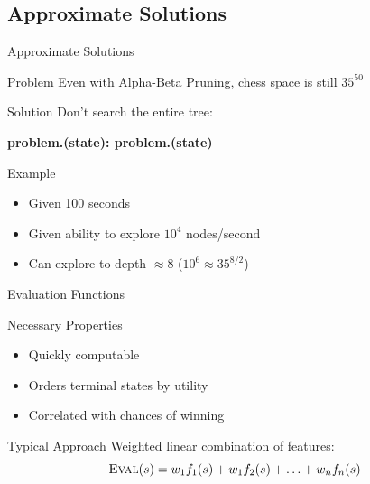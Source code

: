 \documentclass[14pt]{beamer}
\begin{document}
\subsection{Approximate Solutions}
\begin{frame}[fragile]{Approximate Solutions}
	\begin{block}{Problem}
		Even with Alpha-Beta Pruning, chess space is still $35^{50}$
	\end{block}
	\pause
	\begin{block}{Solution}
		Don't search the entire tree:
		\begin{semiverbatim}\scriptsize\bfseries
		     problem.(state):
		         problem.(state)
		
		\end{semiverbatim}
	\end{block}
	\pause\pause
	\begin{block}{Example}
		\begin{itemize}
			\item Given 100 seconds
			\item Given ability to explore $10^4$ nodes/second
			\item Can explore to depth $\approx 8$ ($10^6 \approx 35^{8/2}$)
		\end{itemize}
	\end{block}
\end{frame}
\begin{frame}{Evaluation Functions}
	\begin{block}{Necessary Properties}
		\begin{itemize}
			\item Quickly computable
			\item Orders terminal states by utility
			\item Correlated with chances of winning
		\end{itemize}
	\end{block}
	\pause
	\begin{block}{Typical Approach}
		Weighted linear combination of features:
		\[\mbox{\sc Eval}(s) = w_1 f_1(s) + w_1 f_2(s) + \ldots + w_n f_n(s)\]
	\end{block}
\end{frame}
\end{document}
